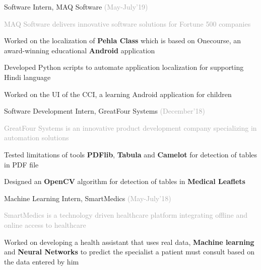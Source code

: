 \begin{cventries}
  \cventry
    {}
    {Software Intern, MAQ Software}
    {\fontsize{9pt}{1em} \textcolor{darkgray}{(May-July'19)}}
    {}
    {
      {\fontsize{9.5pt}{1em}\descriptionfont\textcolor{darkgray}{MAQ Software delivers innovative software solutions for Fortune 500 companies}}
      \vspace{4mm}
      \begin{cvitems}
        \item {Worked on the localization of \textbf{Pehla Class} which is based on Onecourse, an award-winning educational \textbf{Android} application}
        \vspace{0.3mm}
        \item {Developed Python scripts to automate application localization for supporting Hindi language}
        \vspace{0.3mm}
        \item{Worked on the UI of the CCI,  a learning Android application for children}
      \end{cvitems}
    }
  \cventry
    {}
    {Software Development Intern, GreatFour Systems}
    {\fontsize{9pt}{1em} \textcolor{darkgray}{(December'18)}}
    {}
    {
      {\fontsize{9.5pt}{1em}\descriptionfont\textcolor{darkgray}{GreatFour Systems is an innovative product development company specializing in automation solutions}}
      \vspace{4mm}
      \begin{cvitems}
        \item {Tested limitations of tools \textbf{PDFlib}, \textbf{Tabula} and \textbf{Camelot} for detection of tables in PDF file}
        \vspace{0.3mm}
        \item {Designed an \textbf{OpenCV} algorithm for detection of tables in \textbf{Medical Leaflets} }
      \end{cvitems}
    }
  \cventry
    {}
    {Machine Learning Intern, SmartMedics}
    {\fontsize{9pt}{1em} \textcolor{darkgray}{(May-July'18)}}
    {}
    {
      {\fontsize{9.5pt}{1em}\descriptionfont\textcolor{darkgray}{SmartMedics is a technology driven healthcare platform integrating offline and online access to healthcare}}
      \vspace{4mm}
      \begin{cvitems}
        \item {Worked on developing a health assistant that uses real data, \textbf{Machine learning} and \textbf{Neural Networks} to predict the specialist a patient must consult based on the data entered by him}

\end{cvitems}}
\end{cventries}
